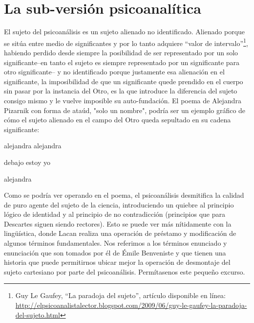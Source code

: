 \section{La sub-versión psicoanalítica}

El sujeto del psicoanálisis es un sujeto alienado no identificado.
Alienado porque se sitúa entre medio de significantes y por lo tanto
adquiere \enquote{valor de intervalo}\footnote{Guy Le Gaufey, \enquote{La paradoja del
  sujeto}, artículo disponible en línea:
  \url{http://elpsicoanalistalector.blogspot.com/2009/06/guy-le-gaufey-la-paradoja-del-sujeto.html}},
habiendo perdido desde siempre la posibilidad de ser representado por un
solo significante--en tanto el sujeto es siempre representado por un
significante para otro significante-- y no identificado porque
justamente esa alienación en el significante, la imposibilidad de que un
significante quede prendido en el cuerpo sin pasar por la instancia del
Otro, es la que introduce la diferencia del sujeto consigo mismo y le
vuelve imposible su auto-fundación. El poema de Alejandra Pizarnik con
forma de ataúd, "solo un nombre", podría ser un ejemplo gráfico de cómo
el sujeto alienado en el campo del Otro queda sepultado en su cadena
significante:

alejandra alejandra

debajo estoy yo

alejandra

Como se podría ver operando en el poema, el psicoanálisis desmitifica la
calidad de puro agente del sujeto de la ciencia, introduciendo un
quiebre al principio lógico de identidad y al principio de no
contradicción (principios que para Descartes siguen siendo rectores).
Esto se puede ver más nítidamente con la lingüística, donde Lacan
realiza una operación de préstamo y modificación de algunos términos
fundamentales. Nos referimos a los términos enunciado y enunciación que
son tomados por él de Émile Benveniste y que tienen una historia que
puede permitirnos ubicar mejor la operación de desmontaje del sujeto
cartesiano por parte del psicoanálisis. Permítasenos este pequeño
excurso.

